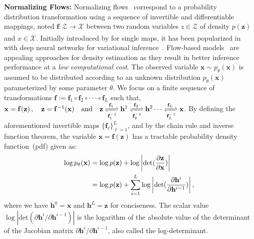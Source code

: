 \documentclass[twoside]{article}
\begin{document}
\textbf{Normalizing Flows:}
Normalizing flows~\cite{kingma2018glow,rezende2015variational} correspond to a probability distribution transformation using  a sequence of invertible and differentiable mappings, noted $\mathbf{f}: \mathcal{Z} \xrightarrow[]{} \mathcal{X}$ between two random variables $z \in \mathcal{Z}$ of density $p(\mathbf{z})$ and $x \in \mathcal{X}$. 
Initially introduced by \cite{tabak2010density} for single maps, it has been popularized in \cite{Dinh2016DensityEU,rippel2013high} with deep neural networks for variational inference~\cite{rezende2015variational}. 
Flow-based models~\cite{Dinh2016DensityEU, dinh2014nice, de2020block, ho2019flow++,papamakarios2019normalizing} are appealing approaches for density estimation as they result in better inference performance at a \emph{low computational cost}.
The observed variable $\mathbf{x} \sim p_{\theta}(\mathbf{x})$ is assumed to be distributed according to an unknown distribution $p_{\theta}(\mathbf{x})$ parameterized by some parameter $\theta$. 
We focus on a finite sequence of transformations $\mathbf{f}:=\mathbf{f}_1  \circ \mathbf{f}_2 \circ   \cdot  \cdot \cdot     \circ   \mathbf{f}_L$ such that, $\mathbf{x}=\mathbf{f}(\mathbf{z})\, , \quad \mathbf{z}=\mathbf{f}^{-1}(\mathbf{x}) \quad \textrm{and} \quad
    \mathbf{z} \xrightleftharpoons[\mathbf{f}_1^{-1}]{\mathbf{f}_1} \mathbf{h}^1 \xrightleftharpoons[\mathbf{f}_2^{-1}]{\mathbf{f}_2} \mathbf{h}^2 \cdots \xrightleftharpoons[\mathbf{f}_L^{-1}]{\mathbf{f}_L}\mathbf{x}$.
By defining the aforementioned invertible maps $\{\mathbf{f}_{\ell} \}_{\ell =1}^L$, and by the chain rule and inverse function theorem, the variable $\mathbf{x}=\mathbf{f}(\mathbf{z})$ has a tractable probability density function~(pdf) given as:
\begin{align}\label{eq:flow}
\log p_{\theta}(\mathbf{x})& = \log p(\mathbf{z})  + \log \bigg| \text{det} ( \frac{\partial \mathbf{z} }{\partial \mathbf{x}} ) \bigg| 
\\\notag
& =  \log p(\mathbf{z}) + \sum_{i=1}^L\log \bigg| \text{det} ( \frac{\partial \mathbf{h}^i } {\partial \mathbf{h}^{i-1}}) \bigg| \, ,
\end{align}
where we have $\mathbf{h}^0 = \mathbf{x}$ and $\mathbf{h}^L = \mathbf{z}$ for conciseness. 
The scalar value $\log |\text{det}( \partial \mathbf{h}^i/\partial \mathbf{h}^{i-1})|$ is the logarithm of the absolute value of the determinant of the Jacobian matrix $\partial \mathbf{h}^i/\partial \mathbf{h}^{i-1}$, also called the log-determinant. 
\end{document}
